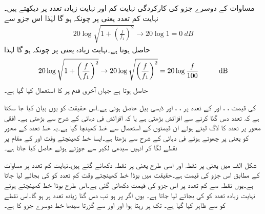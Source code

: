 مساوات کے دوسرے جزو کی کارکردگی نہایت کم اور نہایت زیادہ تعدد پر دیکھتے ہیں۔نہایت کم تعدد یعنی  پر چونکہ  ہو گا لہٰذا اس جزو سے
\begin{align} \label{مساوات_تعدد_ردعمل_بوڈا_کم_تعدد_حصہ}
20 \log  \sqrt{1+\left(\frac{f}{f_1}\right)^2}  \to 20 \log 1 =\SI{0}{dB}
\end{align}
حاصل ہوتا ہے۔نہایت زیادہ یعنی  پر چونکہ  ہو گا لہٰذا
\begin{align} \label{مساوات_تعدد_ردعمل_بوڈا_زیادہ_تعدد_حصہ}
20 \log  \sqrt{1+\left(\frac{f}{f_1}\right)^2} \to 20 \log \sqrt{\left(\frac{f}{f_1}\right)^2} =20 \log \frac{f}{100} \hspace{1 cm} \SI{}{dB}
\end{align}
حاصل ہوتا ہے جہاں آخری قدم پر  کا استعمال کیا گیا ہے۔

 کی قیمت ، ،  اور  کے تعدد پر ، ،  اور  ڈیسی بیل حاصل ہوتی ہے۔اس حقیقت کو یوں بیان کیا جا سکتا ہے کہ تعدد دس گنّا کرنے سے افزائش  بڑھتی ہے یا کہ افزائش   فی دہائی کے شرح سے بڑھتی ہے۔ افقی محور پر تعدد کا لاگ لیتے ہوئے ان قیمتوں کے استعمال سے خط کھینچا گیا ہے۔یہ خط تعدد کے محور کو  یعنی  پر چھوتے ہوئے  فی دہائی کے شرح سے بڑھتا ہے۔ایسا خط کھینچتے وقت   اور   کے مقام پر نقطے  لگا کر انہیں سیدھی لکیر سے جوڑتے ہوئے حاصل کیا جاتا ہے۔

شکل  الف میں  یعنی  پر نقطہ  اور اسی طرح  یعنی  پر نقطہ  دکھائے گئے ہیں۔نہایت کم تعدد پر مساوات  کے مطابق اس جزو کی قیمت  ہے۔حقیقت میں بوڈا خط کھینچتے وقت کم تعدد کو  کی بجائے  لیا جاتا ہے۔یوں نقطہ  سے کم تعدد پر اس جزو کی قیمت  دکھائی گئی ہے۔اس طرح بوڈا خط کھینچتے ہوئے  نہایت زیادہ تعدد کو  کی بجائے  لیا جاتا ہے۔ یوں اگر  پر  ہو تب دس گنا زیادہ تعدد پر  ہو گا۔اس نقطے  کو  سے ظاہر کیا گیا ہے۔ تک  پر رہتا ہوا اور  اور  سے گزرتا سیدھا خط دوسرے جزو کا  ہے۔


